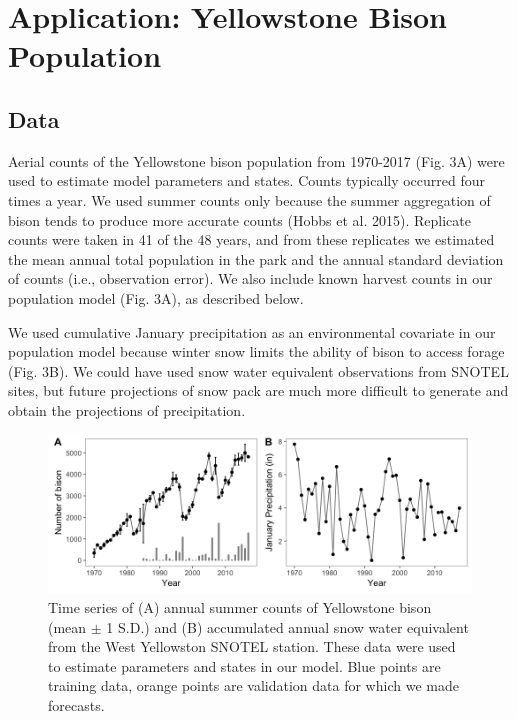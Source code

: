 \documentclass[12pt,]{article}
\begin{document}
\section{Application: Yellowstone Bison
Population}\label{application-yellowstone-bison-population}

\subsection{Data}\label{data}

Aerial counts of the Yellowstone bison population from 1970-2017 (Fig.
3A) were used to estimate model parameters and states. Counts typically
occurred four times a year. We used summer counts only because the
summer aggregation of bison tends to produce more accurate counts (Hobbs
et al. 2015). Replicate counts were taken in 41 of the 48 years, and
from these replicates we estimated the mean annual total population in
the park and the annual standard deviation of counts (i.e., observation
error). We also include known harvest counts in our population model
(Fig. 3A), as described below.

We used cumulative January precipitation as an environmental covariate
in our population model because winter snow limits the ability of bison
to access forage (Fig. 3B). We could have used snow water equivalent
observations from SNOTEL sites, but future projections of snow pack are
much more difficult to generate and obtain the projections of
precipitation.

\begin{figure}[!ht]
  \centering
      \includegraphics{../figures/bison_data_plots.png}
  \caption{Time series of (A) annual summer counts of Yellowstone bison (mean $\pm$ 1 S.D.) and (B) accumulated annual snow water equivalent from the West Yellowston SNOTEL station. These data were used to estimate parameters and states in our model. Blue points are training data, orange points are validation data for which we made forecasts.}
\end{figure}
\end{document}
